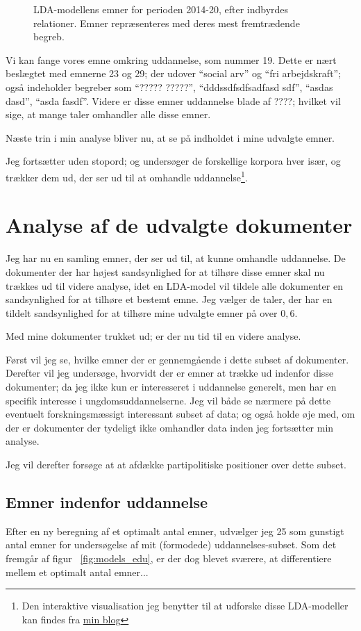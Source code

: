 \begin{figure}
  
  \caption{LDA-modellens emner for perioden 2014-20, efter indbyrdes relationer. Emner repræsenteres med deres mest fremtrædende begreb.}
\label{fig:dendro_all}
\end{figure}

Vi kan fange vores emne omkring uddannelse, som nummer 19.
Dette er nært beslægtet med emnerne 23 og 29; der udover “social arv” og “fri arbejdskraft”; også indeholder begreber som “????? ?????”, “dddssdfsdfsadfasd sdf”, “asdas dasd”, “asda fasdf”.
Videre er disse emner uddannelse blade af ????; hvilket vil sige, at mange taler omhandler alle disse emner.

Næste trin i min analyse bliver nu, at se på indholdet i mine udvalgte emner.

Jeg fortsætter uden stopord; og undersøger de forskellige korpora hver især, og trækker dem ud, der ser ud til at omhandle uddannelse\footnote{Den interaktive visualisation jeg benytter til at udforske disse LDA-modeller kan findes fra \href{martinandreasandersen.com/projects/au/}{min blog}}.

\chapter{Analyse af de udvalgte dokumenter}
Jeg har nu en samling emner, der ser ud til, at kunne omhandle uddannelse.
De dokumenter der har højest sandsynlighed for at tilhøre disse emner skal nu trækkes ud til videre analyse, idet en LDA-model vil tildele alle dokumenter en sandsynlighed for at tilhøre et bestemt emne.
Jeg vælger de taler, der har en tildelt sandsynlighed for at tilhøre mine udvalgte emner på over $0,6$.

Med mine dokumenter trukket ud; er der nu tid til en videre analyse.

Først vil jeg se, hvilke emner der er gennemgående i dette subset af dokumenter.
Derefter vil jeg undersøge, hvorvidt der er emner at trække ud indenfor disse dokumenter; da jeg ikke kun er interesseret i uddannelse generelt, men har en specifik interesse i ungdomsuddannelserne.
Jeg vil både se nærmere på dette eventuelt forskningsmæssigt interessant subset af data; og også holde øje med, om der er dokumenter der tydeligt ikke omhandler data inden jeg fortsætter min analyse.

Jeg vil derefter forsøge at at afdække partipolitiske positioner over dette subset.

\section{Emner indenfor uddannelse}
Efter en ny beregning af et optimalt antal emner, udvælger jeg 25 som gunstigt antal emner for undersøgelse af mit (formodede) uddannelses-subset.
Som det fremgår af figur ~\ref{fig:models_edu}, er der dog blevet sværere, at differentiere mellem et optimalt antal emner...


